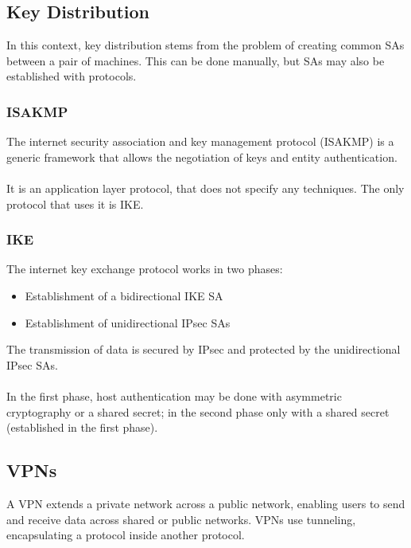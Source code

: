 \documentclass[10pt,a4paper]{report}
\begin{document}
\subsection{Key Distribution}
In this context, key distribution stems from the problem of creating common SAs between a pair of machines. This can be done manually, but SAs may also be established with protocols.
\subsubsection{ISAKMP}
The internet security association and key management protocol (ISAKMP) is a generic framework that allows the negotiation of keys and entity authentication.\\
\\
It is an application layer protocol, that does not specify any techniques. The only protocol that uses it is IKE.
\subsubsection{IKE}
The internet key exchange protocol works in two phases:
\begin{itemize}
\item Establishment of a bidirectional IKE SA
\item Establishment of unidirectional IPsec SAs
\end{itemize}
The transmission of data is secured by IPsec and protected by the unidirectional IPsec SAs.\\
\\
In the first phase, host authentication may be done with asymmetric cryptography or a shared secret; in the second phase only with a shared secret (established in the first phase).
\subsection{VPNs}
A VPN extends a private network across a public network, enabling  users to send and receive data across shared or public networks. VPNs use tunneling, encapsulating a protocol inside another protocol.
\end{document}
